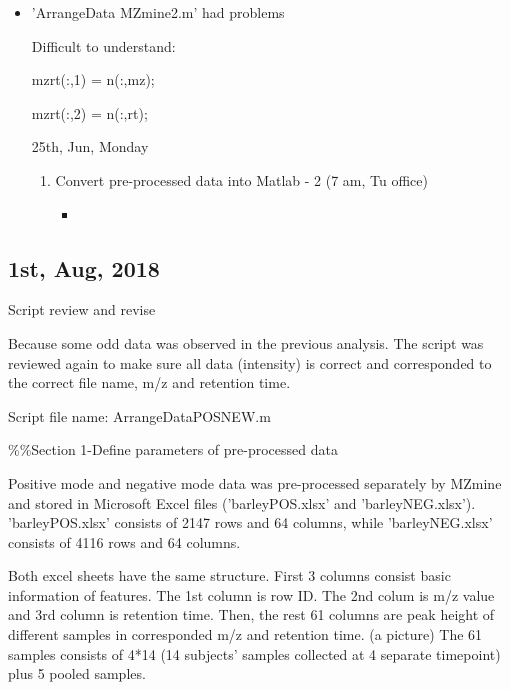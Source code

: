 \begin{enumerate}
\begin{itemize}
        \item 'Arrange\textunderscore Data \textunderscore MZmine2.m' had problems

Difficult to understand:

mzrt(:,1) = n(:,mz); 

mzrt(:,2) = n(:,rt);

25th, Jun, Monday
\begin{enumerate}
    \item Convert pre-processed data into Matlab - 2 (7 am, Tu office)
    \begin{itemize}
        \item 
    \end{itemize}
    
    
    
\end{enumerate}
        
        
        
        \end{itemize}
\end{enumerate}

\subsection{1st, Aug, 2018}

Script review and revise

Because some odd data was observed in the previous analysis. The script was reviewed again to make sure all data (intensity) is correct and corresponded to the correct file name, m/z and retention time.

Script file name: ArrangeDataPOSNEW.m

\%\%Section 1-Define parameters of pre-processed data

Positive mode and negative mode data was pre-processed separately by MZmine and stored in Microsoft Excel files ('barleyPOS.xlsx' and 'barleyNEG.xlsx'). 'barleyPOS.xlsx' consists of 2147 rows and 64 columns, while 'barleyNEG.xlsx' consists of 4116 rows and 64 columns.

Both excel sheets have the same structure. First 3 columns consist basic information of features. The 1st column is row ID. The 2nd colum is m/z value and 3rd column is retention time. Then, the rest 61 columns are peak height of different samples in corresponded m/z and retention time. (a picture)
The 61 samples consists of 4*14 (14 subjects' samples collected at 4 separate timepoint) plus 5 pooled samples.

